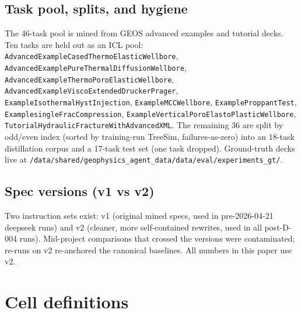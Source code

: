 \documentclass{article}
\begin{document}
\subsection{Task pool, splits, and hygiene}
The 46-task pool is mined from GEOS advanced examples and tutorial decks. Ten tasks are held out as an ICL pool: \texttt{AdvancedExampleCasedThermoElasticWellbore}, \texttt{AdvancedExamplePureThermalDiffusionWellbore}, \texttt{AdvancedExampleThermoPoroElasticWellbore}, \texttt{AdvancedExampleViscoExtendedDruckerPrager}, \texttt{ExampleIsothermalHystInjection}, \texttt{ExampleMCCWellbore}, \texttt{ExampleProppantTest}, \texttt{ExamplesingleFracCompression}, \texttt{ExampleVerticalPoroElastoPlasticWellbore}, \texttt{TutorialHydraulicFractureWithAdvancedXML}. The remaining 36 are split by odd/even index (sorted by training-run TreeSim, failures-as-zero) into an 18-task distillation corpus and a 17-task test set (one task dropped). Ground-truth decks live at \texttt{/data/shared/geophysics\_agent\_data/data/eval/experiments\_gt/}.

\subsection{Spec versions (v1 vs v2)}
Two instruction sets exist: v1 (original mined specs, used in pre-2026-04-21 deepseek runs) and v2 (cleaner, more self-contained rewrites, used in all post-D-004 runs). Mid-project comparisons that crossed the versions were contaminated; re-runs on v2 re-anchored the canonical baselines. All numbers in this paper use v2.

\section{Cell definitions}
\label{app:cells}
\end{document}
